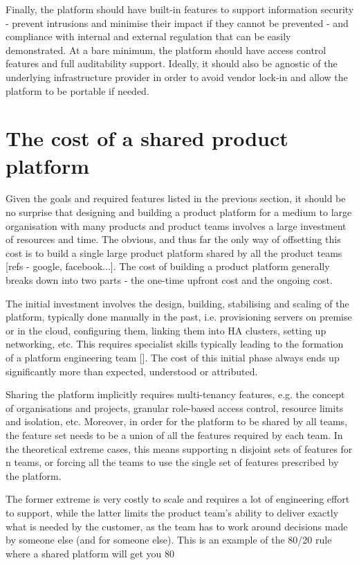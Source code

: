 \documentclass[reprint,amsmath,amssymb,aps]{revtex4-1}
\begin{document}
Finally, the platform should have built-in features to support information security - prevent intrusions and minimise their impact if they cannot be prevented - and compliance with internal and external regulation that can be easily demonstrated. At a bare minimum, the platform should have access control features and full auditability support. Ideally, it should also be agnostic of the underlying infrastructure provider in order to avoid vendor lock-in and allow the platform to be portable if needed.


\section{The cost of a shared product platform}
\label{sec:cost}

Given the goals and required features listed in the previous section, it should be no surprise that designing and building a product platform for a medium to large organisation with many products and product teams involves a large investment of resources and time. The obvious, and thus far the only way of offsetting this cost is to build a single large product platform shared by all the product teams [refs - google, facebook...]. The cost of building a product platform generally breaks down into two parts - the one-time upfront cost and the ongoing cost.

The initial investment involves the design, building, stabilising and scaling of the platform, typically done manually in the past, i.e. provisioning servers on premise or in the cloud, configuring them, linking them into HA clusters, setting up networking, etc. This requires specialist skills typically leading to the formation of a platform engineering team []. The cost of this initial phase always ends up significantly more than expected, understood or attributed.

Sharing the platform implicitly requires multi-tenancy features, e.g. the concept of organisations and projects, granular role-based access control, resource limits and isolation, etc. Moreover, in order for the platform to be shared by all teams, the feature set needs to be a union of all the features required by each team. In the theoretical extreme cases, this means supporting n disjoint sets of features for n teams, or forcing all the teams to use the single set of features prescribed by the platform. 

The former extreme is very costly to scale and requires a lot of engineering effort to support, while the latter limits the product team’s ability to deliver exactly what is needed by the customer, as the team has to work around decisions made by someone else (and for someone else). This is an example of the 80/20 rule where a shared platform will get you 80%
\end{document}
